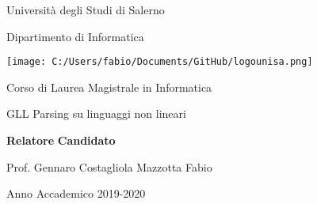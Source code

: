 \begin{titlepage}
\begin{center}
	{\LARGE Università degli Studi di Salerno}\par
	\vspace{0.5cm}
	{\Large Dipartimento di Informatica}\par
	\vspace{1cm}
	\texttt{[image: C:/Users/fabio/Documents/GitHub/logounisa.png]}\par
	\vspace{1cm}
	{\Large Corso di Laurea Magistrale in Informatica}\par
	\vspace{2cm}
	{\Huge GLL Parsing su linguaggi non lineari}\par
	\vspace{2cm}
\end{center}
\begin{flushleft}
	{\large\textbf{Relatore}}
	\hspace{8cm}
	{\large\textbf{Candidato}}\par
	\vspace{0.1cm}
	{\large Prof. Gennaro Costagliola}
	\hspace{4.5cm}
	{\large Mazzotta Fabio}%
\end{flushleft}	
	\vspace{3.5cm}
\begin{center}
	{\large Anno Accademico 2019-2020}
\end{center}
\end{titlepage}